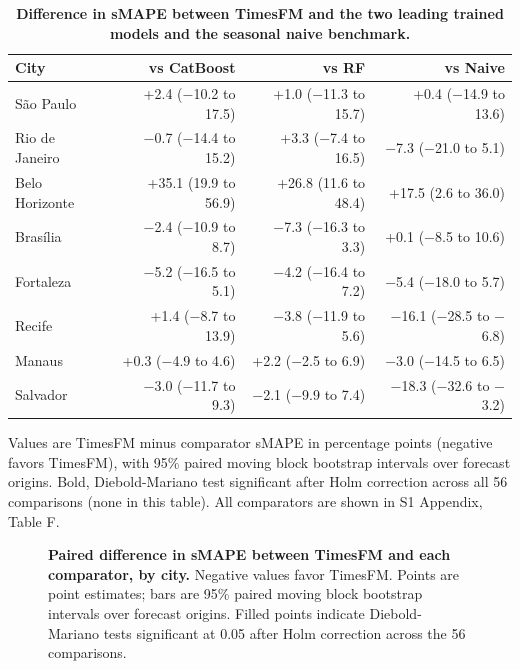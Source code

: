 \documentclass[10pt,letterpaper]{article}
\begin{document}

\begin{table}[!ht]
\centering
\small
\caption{\textbf{Difference in sMAPE between TimesFM and the two leading trained models and the seasonal naive benchmark.}}
\begin{tabular}{lrrr}
\toprule
City & vs CatBoost & vs RF & vs Naive \\
\midrule
S\~ao Paulo & +2.4 ($-$10.2 to 17.5) & +1.0 ($-$11.3 to 15.7) & +0.4 ($-$14.9 to 13.6) \\
Rio de Janeiro & $-$0.7 ($-$14.4 to 15.2) & +3.3 ($-$7.4 to 16.5) & $-$7.3 ($-$21.0 to 5.1) \\
Belo Horizonte & +35.1 (19.9 to 56.9) & +26.8 (11.6 to 48.4) & +17.5 (2.6 to 36.0) \\
Bras\'ilia & $-$2.4 ($-$10.9 to 8.7) & $-$7.3 ($-$16.3 to 3.3) & +0.1 ($-$8.5 to 10.6) \\
Fortaleza & $-$5.2 ($-$16.5 to 5.1) & $-$4.2 ($-$16.4 to 7.2) & $-$5.4 ($-$18.0 to 5.7) \\
Recife & +1.4 ($-$8.7 to 13.9) & $-$3.8 ($-$11.9 to 5.6) & $-$16.1 ($-$28.5 to $-$6.8) \\
Manaus & +0.3 ($-$4.9 to 4.6) & +2.2 ($-$2.5 to 6.9) & $-$3.0 ($-$14.5 to 6.5) \\
Salvador & $-$3.0 ($-$11.7 to 9.3) & $-$2.1 ($-$9.9 to 7.4) & $-$18.3 ($-$32.6 to $-$3.2) \\
\bottomrule
\end{tabular}
\begin{flushleft} Values are TimesFM minus comparator sMAPE in percentage points (negative favors TimesFM), with 95\% paired moving block bootstrap intervals over forecast origins. Bold, Diebold-Mariano test significant after Holm correction across all 56 comparisons (none in this table). All comparators are shown in S1 Appendix, Table F.
\end{flushleft}
\label{table4}
\end{table}


\begin{figure}[!h]
\caption{\textbf{Paired difference in sMAPE between TimesFM and each comparator, by city.}
Negative values favor TimesFM. Points are point estimates; bars are 95\% paired moving block bootstrap intervals over forecast origins. Filled points indicate Diebold-Mariano tests significant at 0.05 after Holm correction across the 56 comparisons.}
\label{fig2}
\end{figure}
\end{document}
